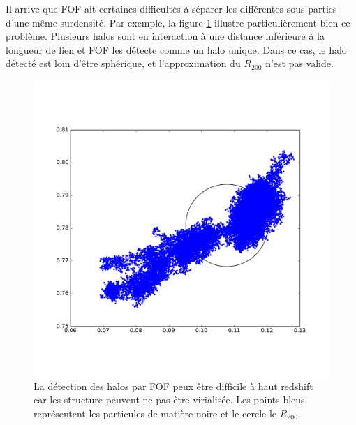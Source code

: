 
%

Il arrive que \ac{FOF} ait certaines difficultés à séparer les différentes sous-parties d'une même surdensité.
Par exemple, la figure \ref{fig:part_halo} illustre particulièrement bien ce problème.
Plusieurs halos sont en interaction à une distance inférieure à la longueur de lien et \ac{FOF} les détecte comme un halo unique. 
Dans ce cas, le halo détecté est loin d'être sphérique, et l'approximation du $R_{200}$ n'est pas valide.


\begin{figure}
	\centering
	\includegraphics[width=.65\textwidth]{img/03/part_halo_R200.pdf} 
    \caption[Détection des halos]{La détection des halos par \ac{FOF} peux être difficile à haut redshift car les structure peuvent ne pas être virialisée.
    Les points bleus représentent les particules de matière noire et le cercle le $R_{200}$.
 	\label{fig:part_halo}}
\end{figure}


